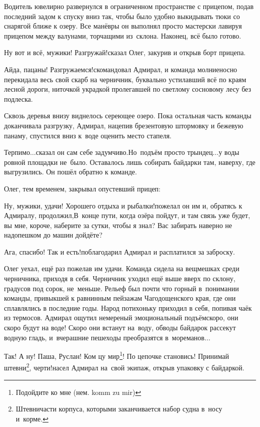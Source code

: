 Водитель ювелирно развернулся в ограниченном пространстве с прицепом, подав последний задом к спуску вниз так, чтобы было удобно выкидывать тюки со снарягой ближе к озеру. Все манёвры он выполнял просто мастерски лавируя прицепом между валунами, торчащими из~склона. Наконец, всё было готово.

\diagdash Ну вот и всё, мужики! Разгружай!\mdash сказал Олег, закурив и открыв борт прицепа.

\diagdash Айда, пацаны! Разгружаемся!\mdash скомандовал Адмирал, и команда молниеносно перекидала весь свой скарб на черничник, буквально устилавший всё по краям лесной дороги, ниточкой украдкой пролегавшей по светлому сосновому лесу без подлеска. 

Сквозь деревья внизу виднелось сереющее озеро. Пока остальная часть команды доканчивала разгрузку, Адмирал, нацепив брезентовую штормовку и бежевую панаму, спустился вниз к~воде оценить место стапеля. 

\diagdash Терпимо$\ldots$\mdash сказал он сам себе задумчиво.\mdash Но~подъём просто трындец$\ldots$\mdash у воды ровной площадки не~было. Оставалось лишь собирать байдарки там, наверху, где выгрузились. Он пошёл обратно к команде.

Олег, тем временем, закрывал опустевший прицеп:

\diagdash Ну, мужики, удачи! Хорошего отдыха и рыбалки!\mdash пожелал он им и, обратясь к Адмиралу, продолжил,\mdash В~конце пути, когда озёра пойдут, и там связь уже будет, вы мне, короче, наберите за сутки, чтобы я знал? Вас забирать наверно не надо\mdash пешком до машин дойдёте?

\diagdash Ага, спасибо! Так и есть!\mdash поблагодарил Адмирал и расплатился за заброску.

Олег уехал, ещё раз пожелав им удачи. Команда сидела на вещмешках среди черничника, приходя в себя. Черничник уходил ещё выше вверх по склону, градусов под сорок, не~меньше. Рельеф был почти что горный в~понимании команды, привыкшей к равнинным пейзажам Чагодощенского края, где они сплавлялись в последние годы. Народ потихоньку приходил в себя, попивая чаёк из термосов. Адмирал ощутил немереный эмоциональный подъём\mdash скоро, они скоро будут на воде! Скоро они встанут на~воду, обводы байдарок рассекут водную гладь, и~вчерашние пешеходы преобразятся в~мореманов$\ldots$ 


\renewcommand*{\thefootnote}{\arabic{footnote}}
\setcounter{footnote}{0}
\diagdash Так! А ну! Паша, Руслан! Ком цу мир\footnote{Подойдите ко мне (нем. komm zu mir)}! По цепочке становись! Принимай штевни\footnote{Штевни\mdash части корпуса, которыми заканчивается набор судна в~носу и~корме.}, черти!\mdash насел Адмирал на~свой экипаж, открыв упаковку с байдаркой.

